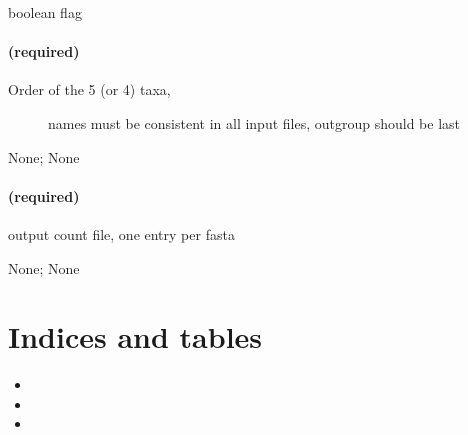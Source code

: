 \documentclass[letterpaper,12pt,english]{sphinxmanual}
\begin{document}
 boolean flag


\subsubsection{ (required)}
\label{\detokenize{prog_desc:names-n-required}}\begin{description}
\item[{ Order of the 5 (or 4) taxa,}] \leavevmode
names must be
consistent in all input files,
outgroup should be last

\end{description}

 None;  None


\subsubsection{ (required)}
\label{\detokenize{prog_desc:out-o-required}}
 output count file, one entry per fasta

 None;  None


\chapter{Indices and tables}
\label{\detokenize{index:indices-and-tables}}\begin{itemize}
\item {} 

\item {} 

\item {} 

\end{itemize}



\renewcommand{\indexname}{Index}
\printindex
\end{document}
